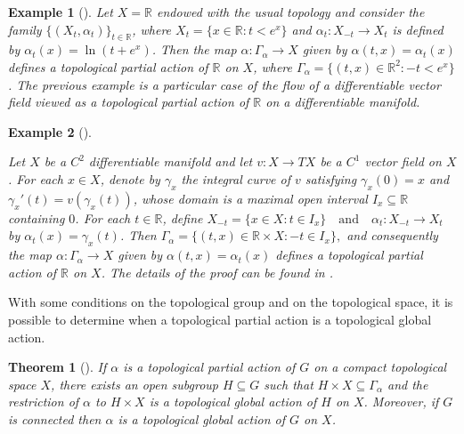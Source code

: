 \documentclass[sn-mathphys-num]{sn-jnl}%
\theoremstyle{thmstyleone}%
\newtheorem{theorem}{Theorem}%
\theoremstyle{thmstyletwo}%
\newtheorem{example}{Example}%
\theoremstyle{thmstylethree}%
\begin{document}
\begin{example}[\cite{Avila-Molina}]%

Let $X=\mathbb{R}$ endowed with the usual topology and consider the family
$\{(X_t,\alpha_t)\}_{t\in\mathbb{R}}$, where
$X_t=\{x\in\mathbb{R}:t<e^x\}$ and $\alpha_t:X_{-t}\to X_t$ is defined by
$\alpha_t(x)=\ln(t+e^x)$. Then the map $\alpha:\Gamma_\alpha\to X$ given by
$\alpha(t,x)=\alpha_t(x)$ defines a topological partial action of $\mathbb{R}$
on $X$, where $\Gamma_\alpha=\{(t,x)\in\mathbb{R}^2:-t<e^x\}$. %
The previous example is a particular case of the flow of a differentiable vector field viewed as a
topological partial action of $\mathbb{R}$ on a differentiable manifold.\\
\end{example}


\begin{example}[\cite{Abadie2}]\label{ejempartop3}%

Let $X$ be a $C^2$ differentiable manifold and let
$v : X \to TX$ be a $C^1$ vector field on $X$. For each $x \in X$, denote by
$\gamma_x$ the integral curve of $v$ satisfying $\gamma_x(0)=x$ and
$\gamma_x'(t)=v(\gamma_x(t))$, whose domain is a maximal open interval
$I_x \subseteq \mathbb{R}$ containing $0$. For each $t \in \mathbb{R}$, define
\(
X_{-t}=\{x\in X : t\in I_x\}
\quad \text{and} \quad
\alpha_t : X_{-t} \to X_t\)
by $\alpha_t(x)=\gamma_x(t)$. Then
\(
\Gamma_\alpha=\{(t,x)\in \mathbb{R}\times X : -t\in I_x\},
\)
and consequently the map $\alpha : \Gamma_\alpha \to X$ given by
$\alpha(t,x)=\alpha_t(x)$ defines a topological partial action of
$\mathbb{R}$ on $X$. The details of the proof can be found in \cite{Avila-Molina}.\\
\end{example}

With some conditions on the topological group and on the topological space, it is possible to determine when a topological partial action is a topological global action.\\

\begin{theorem}[\cite{Abadie2}]
If $ \alpha $ is a topological  partial action of $ G $ on a compact topological space $ X $, there exists an open subgroup $ H \subseteq G $ such that $ H \times X \subseteq \Gamma_\alpha $ and the restriction of $ \alpha $ to $ H \times X $ is a topological global  action of $ H $ on $ X $. Moreover, if $ G $ is connected then $ \alpha $ is a topological  global action of $ G $ on $ X $.\\
\end{theorem}
\end{document}
